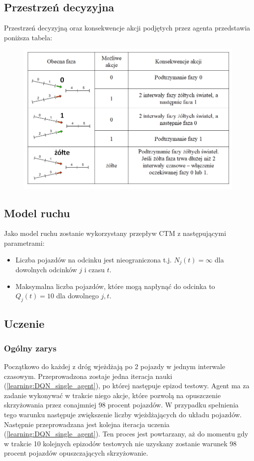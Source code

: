 \documentclass[12pt]{book}
\theoremstyle{plain}
\newcommand{\myref}[1]{(\ref{#1})}
\begin{document}
\subsection{Przestrzeń decyzyjna}
Przestrzeń decyzyjną oraz konsekwencje akcji podjętych przez agenta przedstawia poniższa tabela:
\begin{figure}[H]
	\centering
	\includegraphics[width=17cm]{images/env_14_akcje}
	\label{fig:env_14_akcje}
\end{figure} \noindent

\subsection{Model ruchu}
Jako model ruchu zostanie wykorzystany przepływ CTM z następującymi parametrami:
\begin{itemize}
	\item Liczba pojazdów na odcinku jest nieograniczona t.j. $N_j(t)=\infty$ dla dowolnych odcinków $j$ i czasu $t$.
	\item Maksymalna liczba pojazdów, które mogą napłynąć do odcinka to $Q_j(t)=10$ dla dowolnego $j,t$.
\end{itemize}

\subsection{Uczenie}
\subsubsection{Ogólny zarys}
Początkowo do każdej z dróg wjeżdżają po 2 pojazdy w jednym interwale czasowym. Przeprowadzona zostaje jedna iteracja nauki \myref{learning:DQN_single_agent}, po której następuje epizod testowy. Agent ma za zadanie wykonywać w trakcie niego akcje, które pozwolą na opuszczenie skrzyżowania przez conajmniej 98 procent pojazdów. W przypadku spełnienia tego warunku następuje zwiększenie liczby wjeżdżających do układu pojazdów. Następnie przeprowadzana jest kolejna iteracja uczenia \myref{learning:DQN_single_agent}. Ten proces jest powtarzany, aż do momentu gdy w trakcie 10 kolejnych epizodów testowych nie uzyskany zostanie warunek 98 procent pojazdów opuszczających skrzyżowanie. 
\end{document}
